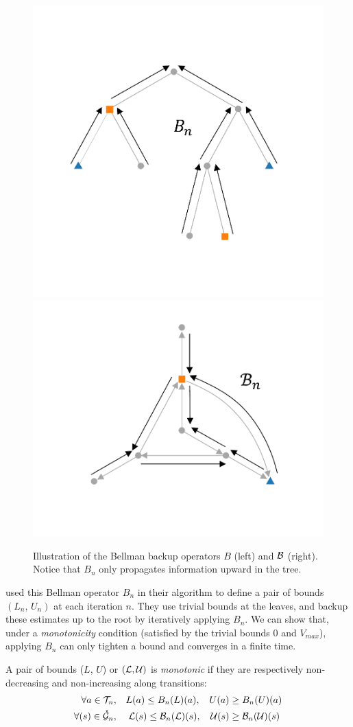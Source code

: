 

\begin{figure}[tp]
	\centering
	\includegraphics[trim={2.0cm 2.9cm 2.5cm 3.1cm}, clip,width=0.44\linewidth]{img/gbop/tree_2}
	\hfill
	\includegraphics[trim={2.7cm 2.7cm 2.7cm 1.1cm}, clip,width=0.44\linewidth]{img/gbop/graph_2}
	\caption{Illustration of the Bellman backup operators $B$ (left) and $\mathcal{B}$ (right). Notice that $B_n$ only propagates information upward in the tree.}
	\label{fig:bellman}
\end{figure}

\citet{Hren2008} used this Bellman operator $B_n$ in their \OPD algorithm to define a pair of bounds $(L_n,\, U_n)$ at each iteration $n$. They use trivial bounds at the leaves, and backup these estimates up to the root by iteratively applying $B_n$. We can show that, under a \textit{monotonicity} condition (satisfied by the trivial bounds $0$ and $V_{max}$), applying $B_n$ can only tighten a bound and converges in a finite time.

\begin{definition}[Monotonicity]
	\begin{leftbar}[defnbar]
	A pair of bounds ($L$, $U$) or $(\mathcal{L}, \mathcal{U})$ is \emph{monotonic} if they are respectively non-decreasing and non-increasing along transitions:
	\begin{align*}
	\forall a\in{\mathcal{T}}_n, \quad & L(a) \leq B_n(L)(a), & U(a) & \geq B_n(U)(a)\\
	\forall (s)\in\mathring{\mathcal{G}}_n, \quad &\; \mathcal{L}(s) \leq \mathcal{B}_n(\mathcal{L})(s),&   \mathcal{U}(s) & \geq \mathcal{B}_n(\mathcal{U})(s)
	\end{align*}
	\end{leftbar}
\end{definition}

